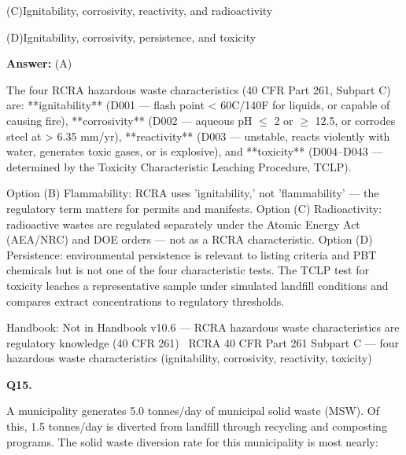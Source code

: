 \documentclass[11pt]{article}
\newcommand{\optline}[2]{\par\noindent\hspace{1.2em}(#1)\hspace{0.6em}#2}
\begin{document}
\optline{C}{Ignitability, corrosivity, reactivity, and radioactivity}
\optline{D}{Ignitability, corrosivity, persistence, and toxicity}
\par\vspace{3pt}
\vspace{2pt}\par\noindent\colorbox{boxbg}{\parbox{\dimexpr\linewidth-2\fboxsep\relax}{%
\vspace{2pt}\textbf{Answer:} (A)\par\vspace{2pt}
{\small The four RCRA hazardous waste characteristics (40 CFR Part 261, Subpart C) are: **ignitability** (D001 --- flash point < 60\textdegree{}C/140\textdegree{}F for liquids, or capable of causing fire), **corrosivity** (D002 --- aqueous pH $\le$ 2 or $\ge$ 12.5, or corrodes steel at > 6.35 mm/yr), **reactivity** (D003 --- unstable, reacts violently with water, generates toxic gases, or is explosive), and **toxicity** (D004--D043 --- determined by the Toxicity Characteristic Leaching Procedure, TCLP).

Option (B) Flammability: RCRA uses 'ignitability,' not 'flammability' --- the regulatory term matters for permits and manifests. Option (C) Radioactivity: radioactive wastes are regulated separately under the Atomic Energy Act (AEA/NRC) and DOE orders --- not as a RCRA characteristic. Option (D) Persistence: environmental persistence is relevant to listing criteria and PBT chemicals but is not one of the four characteristic tests. The TCLP test for toxicity leaches a representative sample under simulated landfill conditions and compares extract concentrations to regulatory thresholds.}\par\vspace{2pt}
{\footnotesize\color{soft}Handbook: Not in Handbook v10.6 --- RCRA hazardous waste characteristics are regulatory knowledge (40 CFR 261) \textbullet\ RCRA 40 CFR Part 261 Subpart C --- four hazardous waste characteristics (ignitability, corrosivity, reactivity, toxicity)}\vspace{2pt}
}}
\vspace{9pt}
\filbreak
\textbf{\color{accent}Q15.}\par\vspace{2pt}
A municipality generates 5.0 tonnes/day of municipal solid waste (MSW). Of this, 1.5 tonnes/day is diverted from landfill through recycling and composting programs. The solid waste diversion rate for this municipality is most nearly:\par\vspace{3pt}
\end{document}
